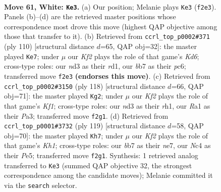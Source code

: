 \documentclass[11pt]{article}
\begin{document}
\clearpage

\begin{figure}[p]\centering
\begin{subfigure}{0.46\textwidth}\centering
\resizebox{\linewidth}{!}{%
\newchessgame
\chessboard[
  setfen={8/Pb6/5k2/6N1/1pN2P2/1Pnn2PB/5K1P/R7 w - - 3 61},
  showmover=false,
  pgfstyle=straightmove, color=movearrow, markmove={f2-e3}
]}
\caption{}
\end{subfigure}\hfill
\begin{subfigure}{0.46\textwidth}\centering
\resizebox{\linewidth}{!}{%
\newchessgame
\chessboard[
  setfen={1k1n4/3P4/PNpK1p2/8/1PB3p1/2P5/8/3r4 w - - 5 56},
  showmover=false,
  pgfstyle=straightmove, color=movearrow, markmove={d6-e7}
]}
\caption{}
\end{subfigure}
\\[4pt]
\begin{subfigure}{0.46\textwidth}\centering
\resizebox{\linewidth}{!}{%
\newchessgame
\chessboard[
  setfen={8/8/3k1p2/2Np2p1/3n2P1/P1R5/1P3P2/5K1r w - - 4 60},
  showmover=false,
  pgfstyle=straightmove, color=movearrow, markmove={f1-g2}
]}
\caption{}
\end{subfigure}\hfill
\begin{subfigure}{0.46\textwidth}\centering
\resizebox{\linewidth}{!}{%
\newchessgame
\chessboard[
  setfen={7k/4N1p1/b4pNp/2n1p3/8/6P1/5P2/6K1 b - - 1 60},
  showmover=false,
  pgfstyle=straightmove, color=movearrow, markmove={h8-h7}
]}
\caption{}
\end{subfigure}
\caption{\textbf{Move 61, White: \texttt{Ke3}.} (a) Our position; Melanie plays \texttt{Ke3} (\texttt{f2e3}). Panels (b)--(d) are the retrieved master positions whose correspondence most drove this move (highest QAP objective among those that transfer to it). (b) Retrieved from \texttt{ccrl\_top\_p0002\#371} (ply 110) [structural distance $d$=65, QAP obj=32]: the master played \texttt{Ke7}; under $\mu$ our \emph{Kf2} plays the role of that game's \emph{Kd6}; cross-type roles: our \emph{n}d3 as their \emph{r}d1, our \emph{b}b7 as their \emph{p}c6; transferred move \texttt{f2e3} \textbf{(endorses this move)}. (c) Retrieved from \texttt{ccrl\_top\_p0002\#3150} (ply 118) [structural distance $d$=66, QAP obj=71]: the master played \texttt{Kg2}; under $\mu$ our \emph{Kf2} plays the role of that game's \emph{Kf1}; cross-type roles: our \emph{n}d3 as their \emph{r}h1, our \emph{R}a1 as their \emph{P}a3; transferred move \texttt{f2g1}. (d) Retrieved from \texttt{ccrl\_top\_p0001\#3732} (ply 119) [structural distance $d$=58, QAP obj=70]: the master played \texttt{Kh7}; under $\mu$ our \emph{Kf2} plays the role of that game's \emph{Kh1}; cross-type roles: our \emph{b}b7 as their \emph{n}e7, our \emph{N}c4 as their \emph{P}e5; transferred move \texttt{f2g1}. Synthesis: 1 retrieved analog transferred to \texttt{Ke3} (summed QAP objective 32, the strongest correspondence among the candidate moves); Melanie committed it via the \texttt{search} selector.}
\label{fig:thought-m120}
\end{figure}
\end{document}
